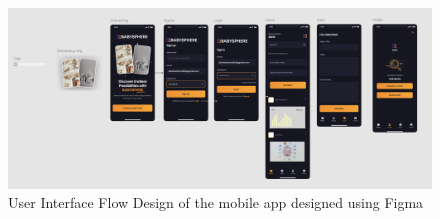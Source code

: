 \documentclass[12pt,a4paper]{report}
\begin{document}
\begin{figure}[hbtp]
  \centering
  \includegraphics[scale=0.32]{./pic/uiflow.png}
  \caption{User Interface Flow Design of the mobile app designed using Figma}
  \label{fig:uiflow}
\end{figure}
\newpage
\renewcommand{\bibname}{References}






\end{document}

